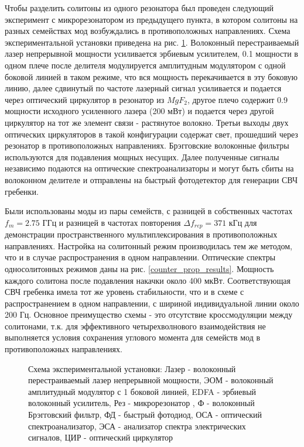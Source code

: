 Чтобы разделить солитоны из одного резонатора был проведен следующий эксперимент с микрорезонатором из предыдущего пункта, в котором солитоны на разных семействах мод возбуждались в противоположных направлениях. Схема экспериментальной установки приведена на рис. \ref{Setup_CounterProp}. Волоконный перестраиваемый лазер непрерывной мощности усиливается эрбиевым усилителем, 0.1 мощности в одном плече после делителя модулируется амплитудным модулятором с одной боковой линией в таком режиме, что вся мощность перекачивается в эту боковую линию, далее сдвинутый по частоте лазерный сигнал усиливается и подается через оптический циркулятор в резонатор из $MgF_2$, другое плечо содержит 0.9 мощности исходного усиленного лазера (200 мВт) и подается через другой циркулятор на тот же элемент связи - растянутое волокно. Третьи выходы двух оптических циркуляторов в такой конфигурации содержат свет, прошедший через резонатор в противоположных направлениях. Брэгговские волоконные фильтры используются для подавления мощных несущих. Далее полученные сигналы независимо подаются на оптические спектроанализаторы и могут быть сбиты на волоконном делителе и отправлены на быстрый фотодетектор для генерации СВЧ гребенки.

Были использованы моды из пары семейств, с разницей в собственных частотах $f_m=2.75$ ГГц и разницей в частотах повторения $\Delta f_{rep}=371$ кГц для демонстрации пространственного мультиплексирования в противоположных направлениях. Настройка на солитонный режим производилась тем же методом, что и в случае распространения в одном направлении. Оптические спектры односолитонных режимов даны на рис. \ref{counter_prop_results}. Мощность каждого солитона после подавления накачки около 400 мкВт. Соответствующая СВЧ гребенка имела тот же уровень стабильности, что и в схеме с распространением в одном направлении, с шириной индивидуальной линии около 200 Гц. Основное преимущество схемы - это отсутствие кроссмодуляции между солитонами, т.к. для эффективного четырехволнового взаимодействия не выполняется условия сохранения углового момента для семейств мод в противоположных направлениях.

\begin{figure}[!htb]
\begin{minipage}{1\linewidth}
\end{minipage}
\caption{Схема экспериментальной установки: Лазер - волоконный перестраиваемый лазер непрерывной мощности, ЭОМ - волоконный амплитудный модулятор с 1 боковой линией, EDFA - эрбиевый волоконный усилитель, Рез - микрорезонатор , Ф - волоконный Брэгговский фильтр, ФД - быстрый фотодиод, ОСА - оптический спектроанализатор, ЭСА - анализатор спектра электрических сигналов, ЦИР - оптический циркулятор}
\label{Setup_CounterProp}
\end{figure}

